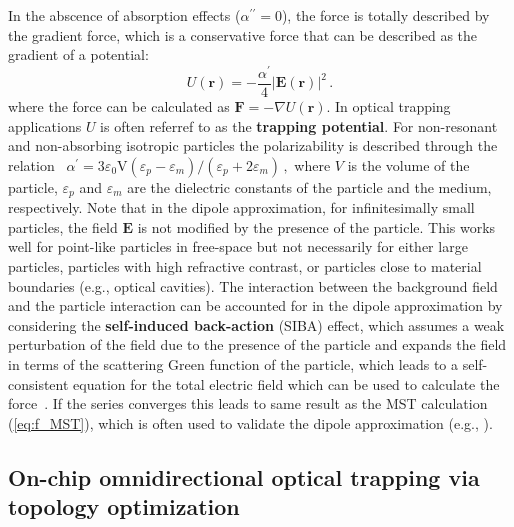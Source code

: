 In the abscence of absorption effects ($\alpha^{\prime \prime}=0$), the force is totally described 
by the gradient force, which is a conservative force that can be described as the gradient 
of a potential:
\begin{equation*}
    U (\mathbf{r}) = -\frac{\alpha^{\prime}}{4} \left|\mathbf{E}(\mathbf{r})\right|^2\,.
\end{equation*}
where the force can be calculated as $\mathbf{F} = -\nabla U(\mathbf{r})$. In optical trapping applications $U$ is often referref to as the \textbf{trapping potential}.
For non-resonant and non-absorbing isotropic particles the polarizability is 
described through the relation~\cite{BornWolf:1999:Book} 
    $\alpha^{\prime}= 3 \varepsilon_0 $V$ (\varepsilon_p-\varepsilon_m)/(\varepsilon_p+2 \varepsilon_m)\,,$
where $V$ is the volume of the particle, $\varepsilon_p$ and $\varepsilon_m$ are the
dielectric constants of the particle and the medium, respectively. Note that in the dipole approximation, for infinitesimally small particles, the field $\mathbf{E}$ is not modified by the presence of the particle.
This works well for point-like particles in free-space but not necessarily 
for either large particles, particles with high refractive contrast, or particles close to material
boundaries (e.g., optical cavities). The interaction between the background field and the particle interaction can be accounted for in the dipole
approximation by considering the \textbf{self-induced back-action} (SIBA) effect, which assumes a weak
perturbation of the field due to the presence of the particle and expands the field in terms of 
the scattering Green function of the particle, which leads to a self-consistent
equation for the total electric field which can be used to calculate the force~\cite{novotny, SIBA, benjamin}. If the series converges this leads 
to same result as the MST calculation (\eqref{eq:f_MST}), which is often used to validate the dipole approximation (e.g., \cite{ownpub1,ownpub3}). 

\subsection*{On-chip omnidirectional optical trapping via topology optimization~\cite{ownpub1}}

